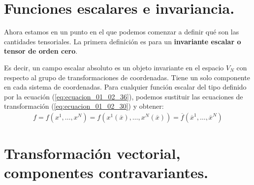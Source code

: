 \documentclass[hidelinks,12pt]{article}
\begin{document}
\section{Funciones escalares e invariancia.}

Ahora estamos en un punto en el que podemos comenzar a definir qué son las cantidades tensoriales. La primera definición es para un \textbf{invariante escalar o tensor de orden cero}.

\begin{center}
\noindent{}
\end{center}
\par
Es decir, un campo escalar absoluto es un objeto invariante en el espacio $V_{N}$ con respecto al grupo de transformaciones de coordenadas. Tiene un solo componente en cada sistema de coordenadas. Para cualquier función escalar del tipo definido por la ecuación (\ref{eq:ecuacion_01_02_36}), podemos sustituir las ecuaciones de transformación (\ref{eq:ecuacion_01_02_30}) y obtener:
\begin{align}
f = f (x^{1}, \ldots, x^{N}) = f (x^{1} (\overline{x}), \ldots, x^{N} (\overline{x})) = \overline{f} (\overline{x}^{1}, \ldots, \overline{x}^{N})
\label{eq:ecuacion_01_02_38}
\end{align}

\section{Transformación vectorial, componentes contravariantes.}
\end{document}

